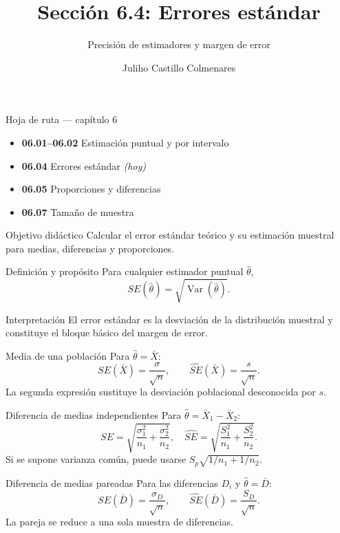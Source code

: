 \documentclass[10pt,aspectratio=169]{beamer}
\title[Errores estándar]{Sección 6.4: Errores estándar}
\subtitle{Precisión de estimadores y margen de error}
\author[J. Castillo Colmenares]{Juliho Castillo Colmenares}
\institute{Tecnológico de Monterrey}
\date{}
\begin{document}
\begin{frame}[plain]\vspace{-0.8cm}\titlepage\end{frame}

\begin{frame}{Hoja de ruta --- capítulo 6}
  \footnotesize
  \begin{itemize}\itemsep=0.08cm
    \item \textbf{06.01--06.02} Estimación puntual y por intervalo
    \item \textbf{06.04} Errores estándar \emph{(hoy)}
    \item \textbf{06.05} Proporciones y diferencias
    \item \textbf{06.07} Tamaño de muestra
  \end{itemize}
  \begin{block}{Objetivo didáctico}
    Calcular el error estándar teórico y su estimación muestral para medias,
    diferencias y proporciones.
  \end{block}
\end{frame}

\begin{frame}{Definición y propósito}
  \footnotesize
  Para cualquier estimador puntual $\hat\theta$,
  \[
    SE(\hat\theta)=\sqrt{\operatorname{Var}(\hat\theta)}.
  \]
  \begin{alertblock}{Interpretación}
    El error estándar es la desviación de la distribución muestral y constituye
    el bloque básico del margen de error.
  \end{alertblock}
\end{frame}

\begin{frame}{Media de una población}
  \footnotesize
  Para $\hat\theta=\bar X$:
  \[
    SE(\bar X)=\frac{\sigma}{\sqrt n},
    \qquad \widehat{SE}(\bar X)=\frac{s}{\sqrt n}.
  \]
  La segunda expresión sustituye la desviación poblacional desconocida por $s$.
\end{frame}

\begin{frame}{Diferencia de medias independientes}
  \footnotesize
  Para $\hat\theta=\bar X_1-\bar X_2$:
  \[
    SE=\sqrt{\frac{\sigma_1^2}{n_1}+\frac{\sigma_2^2}{n_2}},
    \quad
    \widehat{SE}=\sqrt{\frac{S_1^2}{n_1}+\frac{S_2^2}{n_2}}.
  \]
  Si se supone varianza común, puede usarse $S_p\sqrt{1/n_1+1/n_2}$.
\end{frame}

\begin{frame}{Diferencia de medias pareadas}
  \footnotesize
  Para las diferencias $D_i$ y $\hat\theta=\bar D$:
  \[
    SE(\bar D)=\frac{\sigma_D}{\sqrt n},
    \qquad \widehat{SE}(\bar D)=\frac{S_D}{\sqrt n}.
  \]
  La pareja se reduce a una sola muestra de diferencias.
\end{frame}
\end{document}
